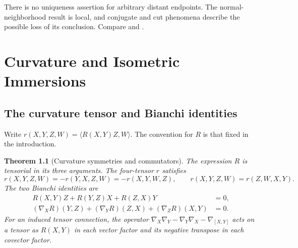 \documentclass[11pt,oneside,openany]{book}
\theoremstyle{plain}
\newtheorem{theorem}{Theorem}[chapter]
\theoremstyle{definition}
\theoremstyle{remark}
\begin{document}
There is no uniqueness assertion for arbitrary distant endpoints.
The normal-neighborhood result is local, and conjugate and cut
phenomena describe the possible loss of its conclusion.
Compare \cite[Chapter 6]{LeeRM} and \cite[Chapter 7]{dC}.

\chapter{Curvature and Isometric Immersions}\label{chap:p202-curvature}

\section{The curvature tensor and Bianchi identities}\label{p202:G12}

Write \(r(X,Y,Z,W)=\langle R(X,Y)Z,W\rangle\).
The convention for \(R\) is that fixed in the introduction.

\begin{theorem}[Curvature symmetries and commutators]
\label{thm:p202-curvature-symmetry}
The expression \(R\) is tensorial in its three arguments. The
four-tensor \(r\) satisfies
\[
 r(X,Y,Z,W)=-r(Y,X,Z,W)=-r(X,Y,W,Z),\qquad
 r(X,Y,Z,W)=r(Z,W,X,Y).
\]
The two Bianchi identities are
\begin{align*}
 R(X,Y)Z+R(Y,Z)X+R(Z,X)Y&=0,\\
 (\nabla_XR)(Y,Z)+(\nabla_YR)(Z,X)+(\nabla_ZR)(X,Y)&=0 .
\end{align*}
For an induced tensor connection, the operator
\(\nabla_X\nabla_Y-\nabla_Y\nabla_X-\nabla_{[X,Y]}\)
acts on a tensor as \(R(X,Y)\) in each vector factor and its
negative transpose in each covector factor.
\end{theorem}
\end{document}
